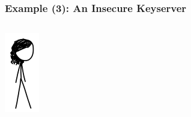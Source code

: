 \documentclass[12pt,english,dvipsnames]{beamer}
\newcommand{\red}[1]{{\color{red}#1}}
\begin{document}
\begin{frame}[fragile]
    \frametitle{Example (3): An \red{Insecure} Keyserver}

    \begin{columns}[b]
        \begin{column}{1.5cm}
        \includegraphics[width=\textwidth]{images/meg.png}
        \end{column}


\end{columns}
\end{frame}
\end{document}
